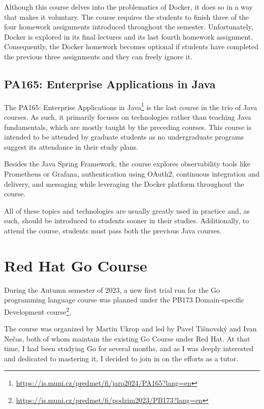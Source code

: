 \documentclass[
  digital,
  color,
  oneside,
  nosansbold,
  nocolorbold,
  nolof,
  nolot,
]{fithesis4}
\begin{document}
Although this course delves into the problematics of Docker, it does so in a way that makes it voluntary. The course requires the students to finish three of the four homework assignments introduced throughout the semester. Unfortunately, Docker is explored in its final lectures and its last fourth homework assignment. Consequently, the Docker homework becomes optional if students have completed the previous three assignments and they can freely ignore it.

\subsection{PA165: Enterprise Applications in Java}\label{enterprise-java-course}

The PA165: Enterprise Applications in Java\footnote{\url{https://is.muni.cz/predmet/fi/jaro2024/PA165?lang=en}} is the last course in the trio of Java courses. As such, it primarily focuses on technologies rather than teaching Java fundamentals, which are mostly taught by the preceding courses. This course is intended to be attended by graduate students as no undergraduate programs suggest its attendance in their study plans.

Besides the Java Spring Framework\cite{spring}, the course explores observability tools like Prometheus\cite{prometheus} or Grafana\cite{grafana}, authentication using OAuth2\cite{oauth2}, continuous integration and delivery, and messaging while leveraging the Docker platform throughout the course.

All of these topics and technologies are usually greatly used in practice and, as such, should be introduced to students sooner in their studies. Additionally, to attend the course, students must pass both the previous Java courses.

\section{Red Hat Go Course}

During the Autumn semester of 2023, a new first trial run for the Go programming language course was planned under the PB173 Domain-specific Development course\footnote{ \url{https://is.muni.cz/predmet/fi/podzim2023/PB173?lang=en}}.

The course was organized by Martin Ukrop and led by Pavel Tišnovský and Ivan Nečas, both of whom maintain the existing Go Course \cite{redhat-go-course} under Red Hat. At that time, I had been studying Go for several months, and as I was deeply interested and dedicated to mastering it, I decided to join in on the efforts as a tutor.
\end{document}
